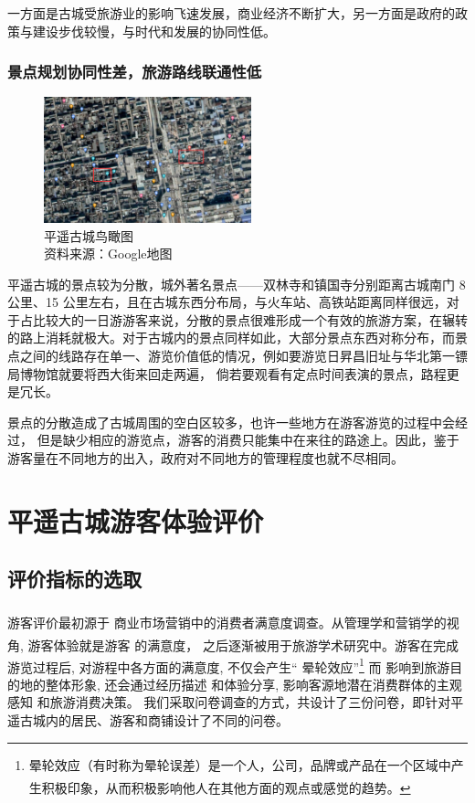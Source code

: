 \documentclass[UTF8]{ctexart}
\newcommand{\upcite}[1]{\textsuperscript{\textsuperscript{\cite{#1}}}}
\begin{document}
一方面是古城受旅游业的影响飞速发展，商业经济不断扩大，另一方面是政府的政策与建设步伐较慢，与时代和发展的协同性低。

        \subsubsection{景点规划协同性差，旅游路线联通性低}
\begin{figure}[H]
    \centering
    \includegraphics[width=6cm]{地图.png}
    \caption[plain]{平遥古城鸟瞰图\\资料来源：Google地图}
    \label{fig:my_label}
\end{figure}
平遥古城的景点较为分散，城外著名景点——双林寺和镇国寺分别距离古城南门 8 公里、15 公里左右，且在古城东西分布局，与火车站、高铁站距离同样很远，对于占比较大的一日游游客来说，分散的景点很难形成一个有效的旅游方案，在辗转的路上消耗就极大。对于古城内的景点同样如此，大部分景点东西对称分布，而景点之间的线路存在单一、游览价值低的情况，例如要游览日昇昌旧址与华北第一镖局博物馆就要将西大街来回走两遍， 倘若要观看有定点时间表演的景点，路程更是冗长。

景点的分散造成了古城周围的空白区较多，也许一些地方在游客游览的过程中会经过， 但是缺少相应的游览点，游客的消费只能集中在来往的路途上。因此，鉴于游客量在不同地方的出入，政府对不同地方的管理程度也就不尽相同。
\section{平遥古城游客体验评价}
    \subsection{评价指标的选取}
    游客评价最初源于 商业市场营销中的消费者满意度调查。\upcite{李智虎2003谈旅游景区游客服务满意度的提升}从管理学和营销学的视角, 游客体验就是游客 的满意度，\upcite{余向洋2006游客体验及其研究方法述评}
    之后逐渐被用于旅游学术研究中。游客在完成游览过程后, 对游程中各方面的满意度, 不仅会产生“ 晕轮效应”\footnote{晕轮效应（有时称为晕轮误差）是一个人，公司，品牌或产品在一个区域中产生积极印象，从而积极影响他人在其他方面的观点或感觉的趋势。\upcite{nisbett1977halo}} 而 影响到旅游目的地的整体形象, 还会通过经历描述 和体验分享, 影响客源地潜在消费群体的主观感知 和旅游消费决策。
    我们采取问卷调查的方式，共设计了三份问卷，即针对平遥古城内的居民、游客和商铺设计了不同的问卷。
\end{document}
